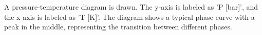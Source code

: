 A pressure-temperature diagram is drawn. The y-axis is labeled as 'P [bar]', and the x-axis is labeled as 'T [K]'. The diagram shows a typical phase curve with a peak in the middle, representing the transition between different phases.